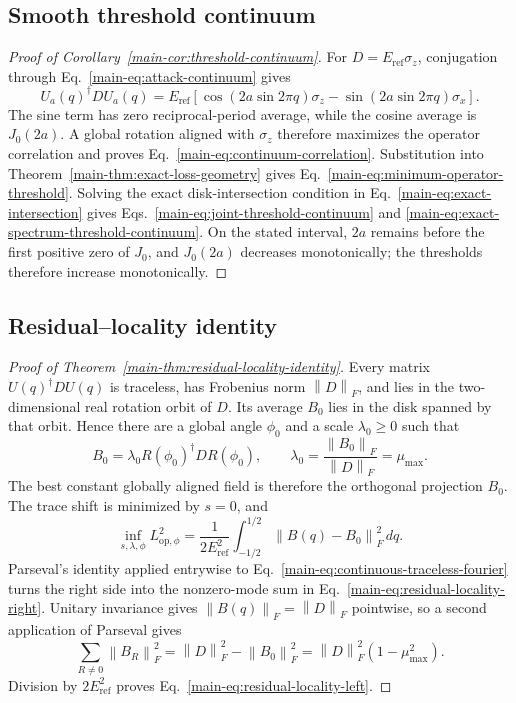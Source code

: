 \documentclass[11pt]{article}
\newcommand{\norm}[1]{\left\lVert #1\right\rVert}
\begin{document}
\subsection{Smooth threshold continuum}
\begin{proof}[Proof of Corollary~\ref{main-cor:threshold-continuum}]
For $D=E_{\mathrm{ref}}\sigma_z$, conjugation through Eq.~\eqref{main-eq:attack-continuum} gives
\[
 U_a(q)^\dagger D U_a(q)
 =E_{\mathrm{ref}}\left[
  \cos\!\left(2a\sin2\pi q\right)\sigma_z
  -\sin\!\left(2a\sin2\pi q\right)\sigma_x
 \right].
\]
The sine term has zero reciprocal-period average, while the cosine average is
$J_0(2a)$. A global rotation aligned with $\sigma_z$ therefore maximizes the operator
correlation and proves Eq.~\eqref{main-eq:continuum-correlation}. Substitution into
Theorem~\ref{main-thm:exact-loss-geometry} gives
Eq.~\eqref{main-eq:minimum-operator-threshold}. Solving the exact disk-intersection condition
in Eq.~\eqref{main-eq:exact-intersection} gives
Eqs.~\eqref{main-eq:joint-threshold-continuum} and
\eqref{main-eq:exact-spectrum-threshold-continuum}. On the stated interval, $2a$ remains
before the first positive zero of $J_0$, and $J_0(2a)$ decreases monotonically; the
thresholds therefore increase monotonically.
\end{proof}

\subsection{Residual--locality identity}
\begin{proof}[Proof of Theorem~\ref{main-thm:residual-locality-identity}]
Every matrix $U(q)^\dagger D U(q)$ is traceless, has Frobenius norm $\norm D_F$, and lies
in the two-dimensional real rotation orbit of $D$. Its average $B_0$ lies in the disk
spanned by that orbit. Hence there are a global angle $\phi_0$ and a scale
$\lambda_0\ge0$ such that
\[
 B_0=\lambda_0R(\phi_0)^\dagger D R(\phi_0),
 \qquad
 \lambda_0=\frac{\norm{B_0}_F}{\norm{D}_F}=\mu_{\max}.
\]
The best constant globally aligned field is therefore the orthogonal projection $B_0$.
The trace shift is minimized by $s=0$, and
\begin{equation}
 \inf_{s,\lambda,\phi}L_{\mathrm{op},\phi}^2
 =\frac{1}{2E_{\mathrm{ref}}^2}
  \int_{-1/2}^{1/2}\norm{B(q)-B_0}_F^2\,dq.
 \label{eq:mean-field-residual}
\end{equation}
Parseval's identity applied entrywise to
Eq.~\eqref{main-eq:continuous-traceless-fourier} turns the right side into the nonzero-mode
sum in Eq.~\eqref{main-eq:residual-locality-right}. Unitary invariance gives
$\norm{B(q)}_F=\norm{D}_F$ pointwise, so a second application of Parseval gives
\[
 \sum_{R\ne0}\norm{B_R}_F^2
 =\norm D_F^2-\norm{B_0}_F^2
 =\norm D_F^2(1-\mu_{\max}^2).
\]
Division by $2E_{\mathrm{ref}}^2$ proves Eq.~\eqref{main-eq:residual-locality-left}.
\end{proof}
\end{document}
